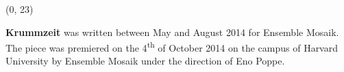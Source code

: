 \documentclass[10pt]{article}
\begin{document}
\begin{textblock}{23}(0, 23)

\textbf{Krummzeit} was written between May and August 2014 for Ensemble Mosaik.
The piece was premiered on the 4\textsuperscript{th} of October 2014 on the
campus of Harvard University by Ensemble Mosaik under the direction of Eno
Poppe.

\end{textblock}
\end{document}

